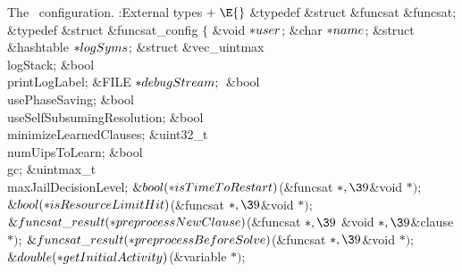 {{{{{The \funcsat\ configuration.
\Y\B\4:External types\X${}\mathrel+\E{}$\6
\&{typedef} \&{struct} \&{funcsat} \&{funcsat};\6
\&{typedef} \&{struct} \&{funcsat\_config} ${}\{{}$\1\6
\&{void} ${}{*}\\{user}{}$;\6
\&{char} ${}{*}\\{name}{}$;\6
\&{struct} \&{hashtable} ${}{*}\\{logSyms}{}$;\6
\&{struct} \&{vec\_uintmax} \\{logStack};\6
\&{bool} \\{printLogLabel};\6
\&{FILE} ${}{*}\\{debugStream};{}$\6
\&{bool} \\{usePhaseSaving};\6
\&{bool} \\{useSelfSubsumingResolution};\6
\&{bool} \\{minimizeLearnedClauses};\6
\&{uint32\_t} \\{numUipsToLearn};\6
\&{bool} \\{gc};\6
\&{uintmax\_t} \\{maxJailDecisionLevel};\7
${}\&{bool}({*}\\{isTimeToRestart}){}$(\&{funcsat} ${}{*},\39{}$\&{void}
${}{*}){}$;\6
${}\&{bool}({*}\\{isResourceLimitHit}){}$(\&{funcsat} ${}{*},\39{}$\&{void}
${}{*}){}$;\6
${}\&{funcsat\_result}({*}\\{preprocessNewClause}){}$(\&{funcsat} ${}{*},\39{}$%
\&{void} ${}{*},\39{}$\&{clause} ${}{*}){}$;\6
${}\&{funcsat\_result}({*}\\{preprocessBeforeSolve}){}$(\&{funcsat} ${}{*},%
\39{}$\&{void} ${}{*}){}$;\6
${}\&{double}({*}\\{getInitialActivity}){}$(\&{variable} ${}{*}){}$;}}}}}
